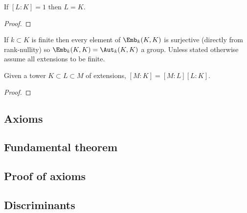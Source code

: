 \documentclass{report}
\begin{document}
\begin{proposition}
    If $[L:K]=1$ then $L=K$.\begin{proof}
        
    \end{proof}
\end{proposition}

\begin{remark}
    If $k\subset K$ is finite then every element of $\Emb_k(K,K)$ is surjective (directly from rank-nullity) so $\Emb_k(K,K)=\Aut_k(K,K)$ a group. Unless stated otherwise assume all extensions to be finite.
\end{remark}

\begin{theorem}
    Given a tower $K\subset L\subset M$ of extensions, $[M:K]=[M:L][L:K]$. \begin{proof}
        
    \end{proof}
\end{theorem}

\subsection{Axioms}

\subsection{Fundamental theorem}

\subsection{Proof of axioms}

\subsection{Discriminants}
\end{document}
